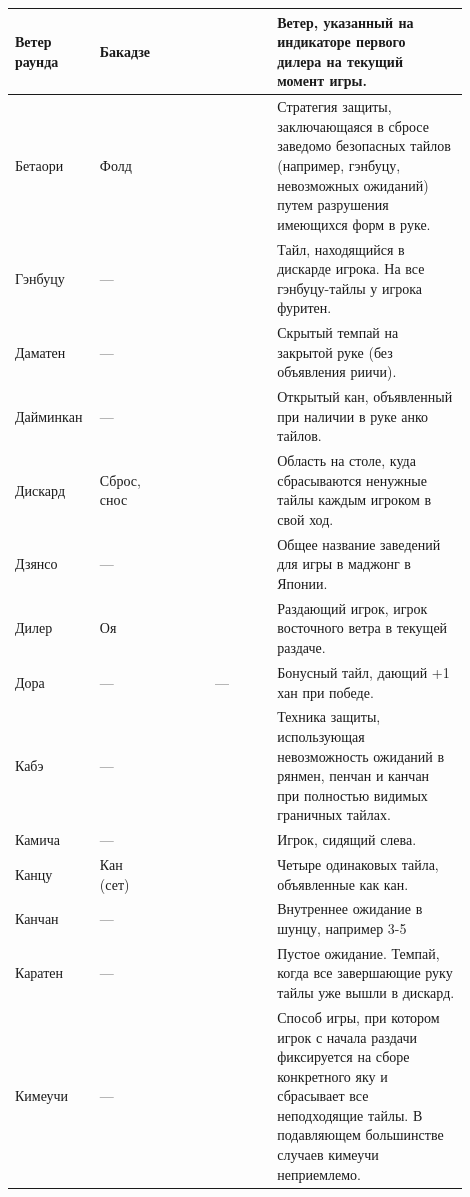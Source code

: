 \begin{tabularx}{\linewidth}{L{0.14\linewidth}L{0.13\linewidth}L{0.1\linewidth}L{0.13\linewidth}L{0.4\linewidth}}
	\midrule
	Ветер раунда & Бакадзе &  &  & Ветер, указанный на индикаторе первого дилера на текущий момент игры. \\
	\midrule
	Бетаори & Фолд &  &  & Стратегия защиты, заключающаяся в сбросе заведомо безопасных тайлов (например, гэнбуцу, невозможных ожиданий) путем разрушения имеющихся форм в руке. \\
	\midrule
	Гэнбуцу & --- &  &  & Тайл, находящийся в дискарде игрока. На все гэнбуцу-тайлы у игрока фуритен. \\
	\midrule
	Даматен & --- &  &  & Скрытый темпай на закрытой руке (без объявления риичи). \\
	\midrule
	Дайминкан & --- &  &  & Открытый кан, объявленный при наличии в руке анко тайлов. \\
	\midrule
	Дискард & Сброс, снос &  &  & Область на столе, куда сбрасываются ненужные тайлы каждым игроком в свой ход. \\
	\midrule
	Дзянсо & --- &  &  & Общее название заведений для игры в маджонг в Японии. \\
	\midrule
	Дилер & Оя &  &  & Раздающий игрок, игрок восточного ветра в текущей раздаче. \\
	\midrule
	Дора & --- &  & --- & Бонусный тайл, дающий +1 хан при победе. \\
	\midrule
	Кабэ & --- &  &  & Техника защиты, использующая невозможность ожиданий в рянмен, пенчан и канчан при полностью видимых граничных тайлах. \\
	\midrule
	Камича & --- &  &  & Игрок, сидящий слева. \\
	\midrule
	Канцу & Кан (сет) &  &  & Четыре одинаковых тайла, объявленные как кан. \\
	\midrule
	Канчан & --- &  &  & Внутреннее ожидание в шунцу, например 3-5 \\
	\midrule
	Каратен & --- &  &  & Пустое ожидание. Темпай, когда все завершающие руку тайлы уже вышли в дискард. \\
	\midrule
	Кимеучи & --- &  &  & Способ игры, при котором игрок с начала раздачи фиксируется на сборе конкретного яку и сбрасывает все неподходящие тайлы. В подавляющем большинстве случаев кимеучи неприемлемо. \\

\end{tabularx}

